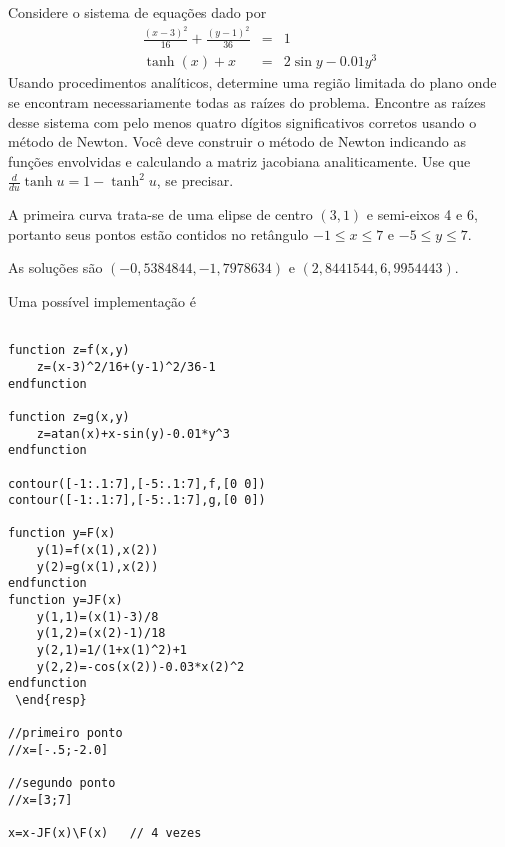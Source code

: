 \begin{exer} Considere o sistema de equações dado por
\begin{eqnarray}
\frac{(x-3)^2}{16}+\frac{(y-1)^2}{36}&=&1\\
\tanh(x)+x&=&2\sin y-0.01y^3
\end{eqnarray}
Usando procedimentos analíticos, determine uma região limitada do plano onde se encontram necessariamente todas as raízes do problema.
Encontre as raízes desse sistema com pelo menos quatro dígitos significativos corretos usando o método de Newton. Você deve construir o método de Newton indicando as funções envolvidas e calculando a matriz jacobiana analiticamente. Use que $\frac{d}{du}\tanh u = 1-\tanh^2u$, se precisar.
\end{exer}
\begin{resp}
 A primeira curva trata-se de uma elipse de centro $(3,1)$ e semi-eixos 4 e 6, portanto seus pontos estão contidos no retângulo $-1\leq x \leq 7$ e $-5\leq y \leq 7$.

As soluções são $\left( -0,5384844 , -1,7978634\right)$ e $\left(2,8441544, 6,9954443\right)$.

\ifisscilab
Uma possível implementação é
\begin{verbatim}

function z=f(x,y)
    z=(x-3)^2/16+(y-1)^2/36-1
endfunction

function z=g(x,y)
    z=atan(x)+x-sin(y)-0.01*y^3
endfunction

contour([-1:.1:7],[-5:.1:7],f,[0 0])
contour([-1:.1:7],[-5:.1:7],g,[0 0])

function y=F(x)
    y(1)=f(x(1),x(2))
    y(2)=g(x(1),x(2))
endfunction
function y=JF(x)
    y(1,1)=(x(1)-3)/8
    y(1,2)=(x(2)-1)/18
    y(2,1)=1/(1+x(1)^2)+1
    y(2,2)=-cos(x(2))-0.03*x(2)^2
endfunction
 \end{resp}

//primeiro ponto
//x=[-.5;-2.0]

//segundo ponto
//x=[3;7]

x=x-JF(x)\F(x)   // 4 vezes
\end{verbatim}
\fi
\end{resp}


